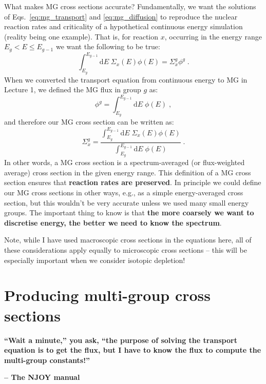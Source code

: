 \documentclass{article}
\begin{document}
What makes MG cross sections accurate? Fundamentally, we want the solutions of Eqs.~\eqref{eq:mg_transport} and \eqref{eq:mg_diffusion} to reproduce the nuclear reaction rates and criticality of a hypothetical continuous energy simulation (reality being one example). That is, for reaction $x$, occurring in the energy range $E_{g} < E\leq E_{g-1}$ we want the following to be true:
\begin{equation}
    \int^{E_{g-1}}_{E_g}\mathrm{d}E\;\Sigma_x(E)\phi(E) = \Sigma^g_x\phi^g\;\mathrm{.}
\end{equation}
When we converted the transport equation from continuous energy to MG in Lecture 1, we defined the MG flux in group $g$ as:
\begin{equation}
    \phi^g =     \int^{E_{g-1}}_{E_g}\mathrm{d}E\;\phi(E)\;\mathrm{,}
\end{equation}
and therefore our MG cross section can be written as:
\begin{equation}\label{eq:MG}
    \Sigma^g_x = \frac{\int^{E_{g-1}}_{E_g}\mathrm{d}E\;\Sigma_x(E)\phi(E)}{\int^{E_{g-1}}_{E_g}\mathrm{d}E\;\phi(E)}\;\mathrm{.}
\end{equation}
In other words, a MG cross section is a spectrum-averaged (or flux-weighted average) cross section in the given energy range. This definition of a MG cross section ensures that \textbf{reaction rates are preserved}. In principle we could define our MG cross sections in other ways, e.g., as a simple energy-averaged cross section, but this wouldn't be very accurate unless we used many small energy groups. The important thing to know is that \textbf{the more coarsely we want to discretise energy, the better we need to know the spectrum}.

Note, while I have used macroscopic cross sections in the equations here, all of these considerations apply equally to microscopic cross sections -- this will be especially important when we consider isotopic depletion!

\section{Producing multi-group cross sections}

\begin{displayquote}
\textbf{``Wait a minute,'' you ask, ``the purpose of solving the transport equation is to get the flux, but I have to know the flux to compute the multi-group constants!''}

\textbf{-- The NJOY manual}
\end{displayquote}
\end{document}
